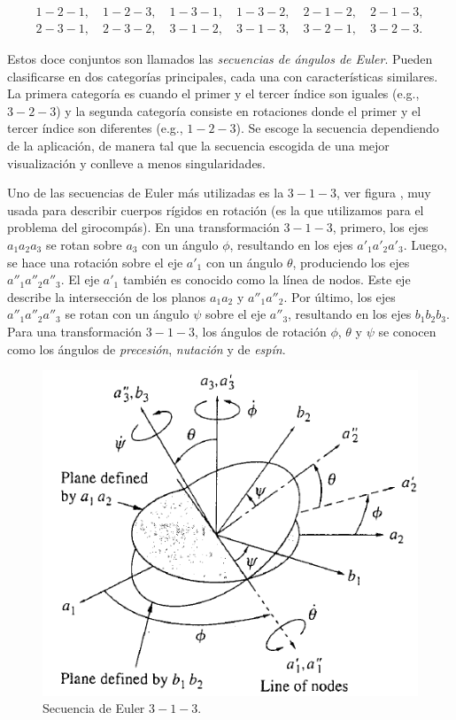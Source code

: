 \documentclass[a4paper,10pt]{article}
\numberwithin{equation}{section}
\begin{document}
\begin{align*}
 1-2-1,\quad 1-2-3,\quad 1-3-1,\quad 1-3-2,\quad 2-1-2,\quad 2-1-3, \\
 2-3-1,\quad 2-3-2,\quad 3-1-2,\quad 3-1-3,\quad 3-2-1,\quad 3-2-3.
\end{align*}

Estos doce conjuntos son llamados las \emph{secuencias de ángulos de Euler}. Pueden 
clasificarse en dos categorías principales, cada una con características similares. 
La primera categoría es cuando el primer y el tercer índice son iguales (e.g., $3-2-3$) 
y la segunda categoría consiste en rotaciones donde el primer y el tercer índice 
son diferentes (e.g., $1-2-3$). Se escoge la secuencia dependiendo de la aplicación, 
de manera tal que la secuencia escogida de una mejor visualización y conlleve a 
menos singularidades.
 
\vspace{.3cm}

Uno de las secuencias de Euler más utilizadas es la $3-1-3$, ver figura , muy usada para describir 
cuerpos rígidos en rotación (es la que utilizamos para el problema del girocompás). En 
una transformación $3-1-3$, primero, los ejes $a_1a_2a_3$ se rotan sobre $a_3$ 
con un ángulo $\phi$, resultando en los ejes $a'_1a'_2a'_3$. Luego, se hace una rotación 
sobre el eje $a'_1$ con un ángulo $\theta$, produciendo los ejes $a''_1a''_2a''_3$. 
El eje $a'_1$ también es conocido como la línea de nodos. Este eje describe la 
intersección de los planos $a_1a_2$ y $a''_1a''_2$. Por último, los ejes $a''_1a''_2a''_3$ 
se rotan con un ángulo $\psi$ sobre el eje $a''_3$, resultando en los ejes $b_1b_2b_3$.
Para una transformación $3-1-3$, los ángulos de rotación $\phi$, $\theta$ y $\psi$ se 
conocen como los ángulos de \emph{precesión}, \emph{nutación} y de \emph{espín}.


\begin{figure}[H]
\center 
\includegraphics[scale=0.38]{apendice2fig1}
\caption{Secuencia de Euler $3-1-3$.}
\label{fig:apendice2fig1}
\end{figure}
\end{document}
